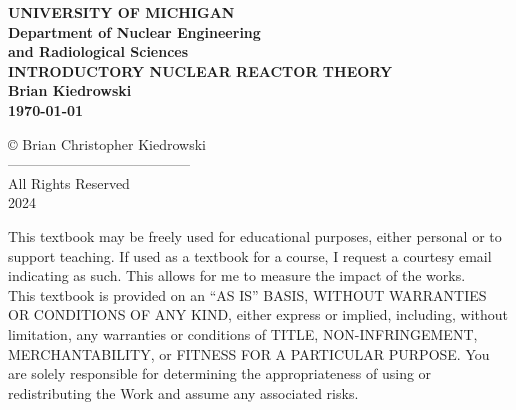 %  


\thispagestyle{empty}
\begin{center}
\vspace*{1.4in}
{\LARGE  {\bf UNIVERSITY OF MICHIGAN   \vspace*{0.7in} \\   
   Department of Nuclear Engineering \\ and Radiological Sciences
      \vspace*{0.7in} \\
   INTRODUCTORY NUCLEAR REACTOR THEORY \vspace*{0.7in} \\
   Brian Kiedrowski }} \\
    \vspace{1cm} {\bf \today }
\end{center}
\pagebreak


\setcounter{page}{1}
\setcounter{chapter}{0}

 \begin{center}
 \copyright \; {\large Brian Christopher Kiedrowski \\
 --------------------------------------- \\
 All Rights Reserved \\
 2024 }
 \end{center}
 
 \vspace*{3em}
\noindent \small This textbook may be freely used for educational purposes, either personal or to support teaching. If used as a textbook for a course, I request a courtesy email indicating as such. This allows for me to measure the impact of the works. \\

\noindent  This textbook is provided on an ``AS IS'' BASIS, WITHOUT WARRANTIES OR CONDITIONS OF ANY KIND, either express or implied, including, without limitation, any warranties or conditions of TITLE, NON-INFRINGEMENT, MERCHANTABILITY, or FITNESS FOR A PARTICULAR PURPOSE. You are solely responsible for determining the appropriateness of using or redistributing the Work and assume any associated risks. \\

